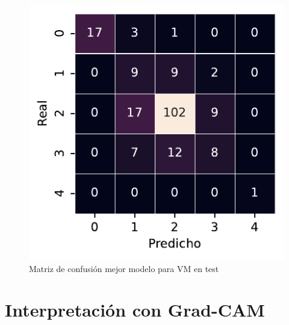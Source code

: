 \begin{figure}[htbp]
    \includegraphics[width=0.75\linewidth]{figures/5_experiments/single-vm-cm.pdf}
    \caption{Matriz de confusión mejor modelo para VM en test}
    \label{fig5:VM_confusion_matrix}
\end{figure}

\section{Interpretación con Grad-CAM}

